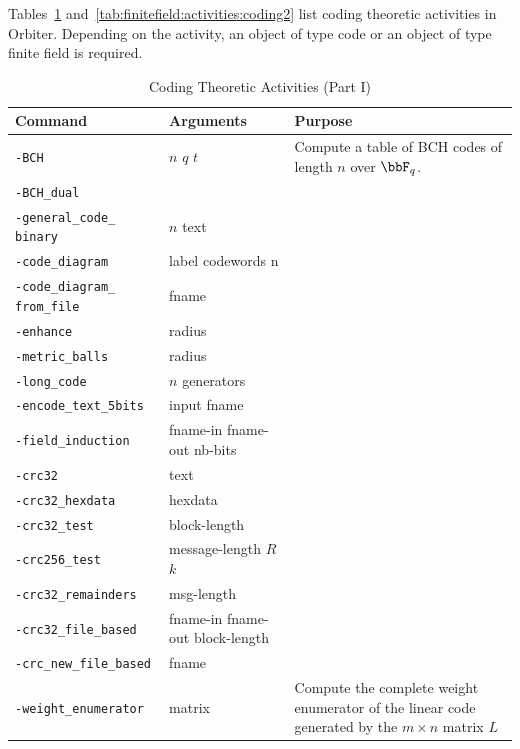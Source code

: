 Tables~\ref{tab:finitefield:activities:coding1} and~\ref{tab:finitefield:activities:coding2} list coding theoretic activities in Orbiter. 
Depending on the activity, an object of type code or an object of type finite field is required.
\begin{table}
	\begin{center}
	\begin{tabular}{|p{4cm}|p{3cm}|p{7cm}|}
		\hline
		Command & Arguments & Purpose \\
		\hline
		\hline
		\verb'-BCH' & $n$ $q$ $t$  & Compute a table of BCH codes of length $n$ over $\bbF_q$. \\
		\hline
		\verb'-BCH_dual' &   &  \\
		\hline
		\verb'-general_code_' \verb'binary' &  $n$ text &  \\
		\hline
		\verb'-code_diagram' & label codewords n  &  \\
		\hline
		\verb'-code_diagram_' \verb'from_file' & fname  &  \\
		\hline
		\verb'-enhance' &  radius &  \\
		\hline
		\verb'-metric_balls' & radius  &  \\
		\hline
		\verb'-long_code' & $n$ generators  &  \\
		\hline
		\verb'-encode_text_5bits' & input fname  &  \\
		\hline
		\verb'-field_induction' & fname-in fname-out nb-bits  &  \\
		\hline
		\verb'-crc32' & text  &  \\
		\hline
		\verb'-crc32_hexdata' & hexdata  &  \\
		\hline
		\verb'-crc32_test' &  block-length &  \\
		\hline
		\verb'-crc256_test' & message-length $R$ $k$  &  \\
		\hline
		\verb'-crc32_remainders' & msg-length  &  \\
		\hline
		\verb'-crc32_file_based' & fname-in fname-out block-length  &  \\
		\hline
		\verb'-crc_new_file_based' & fname  &  \\
		\hline
		\verb'-weight_enumerator' &  matrix &  
		Compute the complete weight enumerator of the 
		linear code generated by the $m \times n$ matrix $L$  \\
		\hline
		\end{tabular}
	\end{center}
	\caption{\label{tab:finitefield:activities:coding1}Coding Theoretic Activities (Part I)}
	\end{table}
